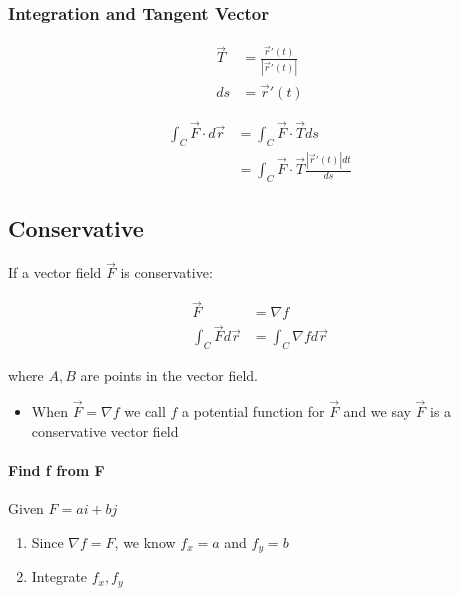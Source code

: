     \subsubsection{Integration and Tangent Vector}

      \begin{align*}
        \vec{T} &= \frac{\vec{r}'\left( t \right)}{\left| \vec{r}'\left( t \right) \right|} \\
        ds &= \vec{r}'\left( t \right)
      \end{align*}

      \begin{align*}
        \int_{C} \vec{F} \cdot d \vec{r}
        &= \int_{C} \vec{F} \cdot \vec{T} ds \\
        &= \int_{C} \vec{F} \cdot \vec{T} \frac{\left| \vec{r}'\left( t \right) \right| dt}{ds}
      \end{align*}

  \subsection{Conservative}

    If a vector field $ \vec{F} $ is conservative:

    \begin{align}
      \vec{F} &= \nabla f \\
      \int_{C} \vec{F} d \vec{r} &= \int_{C} \nabla f d\vec{r}
    \end{align}

    where $ A, B $ are points in the vector field.

    \begin{itemize}
      \item When $ \vec{F} = \nabla f $ we call $ f $ a potential function
      for $ \vec{F} $ and we say $ \vec{F} $ is a conservative vector field
    \end{itemize}

    \paragraph{Find f from F}
    Given $ F = ai + bj $

    \begin{enumerate}
      \item Since $ \nabla f = F $, we know $ f_{x} = a $  and
      $ f_{y} = b $
      \item Integrate $ f_{x}, f_{y} $
    \end{enumerate}

